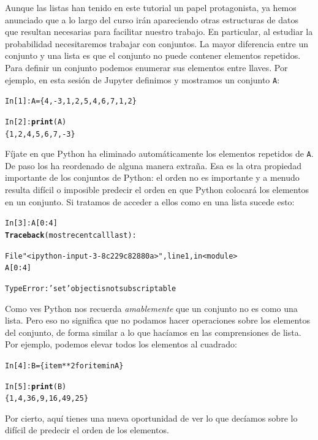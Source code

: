 \documentclass[10pt,a4paper]{article}\usepackage[]{graphicx}\usepackage[]{color}
\makeatletter
\newcommand{\hlstr}[1]{\textcolor[rgb]{0.192,0.494,0.8}{#1}}%
\newcommand{\hlkwd}[1]{\textcolor[rgb]{0.737,0.353,0.396}{\textbf{#1}}}%
\newenvironment{kframe}{%
 \def\at@end@of@kframe{}%
 \ifinner\ifhmode%
  \def\at@end@of@kframe{\end{minipage}}%
  \begin{minipage}{\columnwidth}%
 \fi\fi%
 \def\FrameCommand##1{\hskip\@totalleftmargin \hskip-\fboxsep
 \colorbox{shadecolor}{##1}\hskip-\fboxsep
     \hskip-\linewidth \hskip-\@totalleftmargin \hskip\columnwidth}%
 \MakeFramed {\advance\hsize-\width
   \@totalleftmargin\z@ \linewidth\hsize
   \@setminipage}}%
 {\par\unskip\endMakeFramed%
 \at@end@of@kframe}
\newenvironment{knitrout}{}{} %
\newcounter {cont01}
\makeatother
\begin{document}
Aunque las listas han tenido en este tutorial un papel protagonista, ya hemos anunciado que a lo largo del curso irán apareciendo otras estructuras de datos que resultan necesarias para facilitar nuestro trabajo. En particular, al estudiar la probabilidad necesitaremos trabajar con {\sf conjuntos}. La mayor diferencia entre un conjunto y una lista es que el conjunto no puede contener elementos repetidos. Para definir un conjunto podemos enumerar sus elementos entre llaves. Por ejemplo, en esta sesión de Jupyter definimos y mostramos un conjunto {\tt A}:
\begin{knitrout}
\color{fgcolor}\begin{kframe}
\begin{alltt}
In [1]: A = \{4, -3, 1, 2, 5, 4, 6, 7, 1, 2\}

In [2]: \hlkwd{print}(A)
\{1, 2, 4, 5, 6, 7, -3\}
\end{alltt}
\end{kframe}
\end{knitrout}
Fíjate en que Python ha eliminado automáticamente los elementos repetidos de {\tt A}. De paso los ha reordenado de alguna manera extraña. Esa es la otra propiedad importante de los conjuntos de Python: el orden no es importante y a menudo resulta difícil o imposible predecir el orden en que Python colocará los elementos en un conjunto. Si tratamos de acceder a ellos como en una lista sucede esto:
\begin{knitrout}
\color{fgcolor}\begin{kframe}
\begin{alltt}
In [3]: A[0:4]
\hlkwd{Traceback} (most recent call last):

  File \hlstr{"<ipython-input-3-8c229c82880a>"}, line 1, in <module>
    A[0:4]

TypeError: \hlstr{'set'} object is not subscriptable
\end{alltt}
\end{kframe}
\end{knitrout}
Como ves Python nos recuerda {\em amablemente} que un conjunto no es como una lista. Pero eso no significa que no podamos hacer operaciones sobre los elementos del conjunto, de forma similar a lo que hacíamos en las comprensiones de lista. Por ejemplo, podemos elevar todos los elementos al cuadrado:
\begin{knitrout}
\color{fgcolor}\begin{kframe}
\begin{alltt}
In [4]: B = \{item**2 for item in A\}

In [5]: \hlkwd{print}(B)
\{1, 4, 36, 9, 16, 49, 25\}
\end{alltt}
\end{kframe}
\end{knitrout}
Por cierto, aquí tienes una nueva oportunidad de ver lo que decíamos sobre lo difícil de predecir el orden de los elementos.
\end{document}
